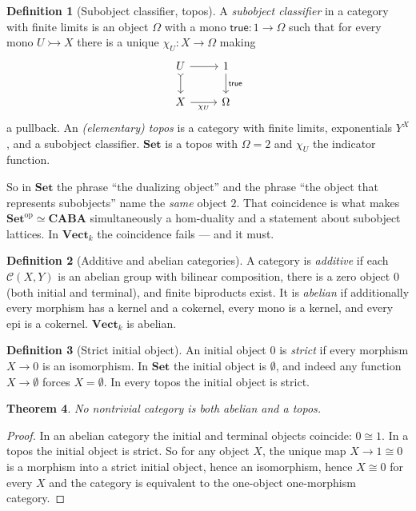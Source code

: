 \documentclass[11pt,a4paper]{article}
\newtheorem{theorem}{Theorem}[section]
\theoremstyle{definition}
\newtheorem{definition}[theorem]{Definition}
\theoremstyle{remark}
\newcommand{\cat}[1]{\mathbf{#1}}
\newcommand{\Set}{\cat{Set}}
\newcommand{\CABA}{\cat{CABA}}
\newcommand{\Vect}{\cat{Vect}}
\newcommand{\op}{\mathrm{op}}
\begin{document}
\begin{definition}[Subobject classifier, topos]
A \emph{subobject classifier} in a category with finite limits is an object $\Omega$ with a
mono $\mathsf{true} : 1 \to \Omega$ such that for every mono $U \rightarrowtail X$ there is a
unique $\chi_U : X \to \Omega$ making
\[
\begin{tikzcd}
U \arrow[r] \arrow[d, rightarrowtail] & 1 \arrow[d,"\mathsf{true}"] \\
X \arrow[r,"\chi_U"'] & \Omega
\end{tikzcd}
\]
a pullback. An \emph{(elementary) topos} is a category with finite limits, exponentials
$Y^{X}$, and a subobject classifier. $\Set$ is a topos with $\Omega = 2$ and $\chi_U$ the
indicator function.
\end{definition}

So in $\Set$ the phrase ``the dualizing object'' and the phrase ``the object that represents
subobjects'' name the \emph{same} object $2$. That coincidence is what makes
$\Set^{\op} \simeq \CABA$ simultaneously a hom-duality and a statement about subobject
lattices. In $\Vect_k$ the coincidence fails --- and it must.

\begin{definition}[Additive and abelian categories]
A category is \emph{additive} if each $\mathcal{C}(X,Y)$ is an abelian group with bilinear
composition, there is a zero object $0$ (both initial and terminal), and finite biproducts
exist. It is \emph{abelian} if additionally every morphism has a kernel and a cokernel, every
mono is a kernel, and every epi is a cokernel. $\Vect_k$ is abelian.
\end{definition}

\begin{definition}[Strict initial object]
An initial object $0$ is \emph{strict} if every morphism $X \to 0$ is an isomorphism. In
$\Set$ the initial object is $\emptyset$, and indeed any function $X \to \emptyset$ forces
$X = \emptyset$. In every topos the initial object is strict.
\end{definition}

\begin{theorem}\label{thm:notopos}
No nontrivial category is both abelian and a topos.
\end{theorem}

\begin{proof}
In an abelian category the initial and terminal objects coincide: $0 \cong 1$. In a topos the
initial object is strict. So for any object $X$, the unique map $X \to 1 \cong 0$ is a
morphism into a strict initial object, hence an isomorphism, hence $X \cong 0$ for every $X$
and the category is equivalent to the one-object one-morphism category.
\end{proof}
\end{document}
